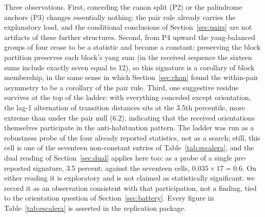 \documentclass[11pt]{article}
\begin{document}
Three observations. First, conceding the canon split (P2) or the palindrome anchors (P3) changes essentially nothing: the pair rule already carries the explanatory load, and the conditional conclusions of Section~\ref{sec:pairs} are not artifacts of these further structures. Second, from P4 upward the yang-balanced groups of four cease to be a statistic and become a constant: preserving the block partition preserves each block's yang sum (in the received sequence the sixteen sums include exactly seven equal to 12), so this signature is a corollary of block membership, in the same sense in which Section~\ref{sec:chan} found the within-pair asymmetry to be a corollary of the pair rule. Third, one suggestive residue survives at the top of the ladder: with everything conceded except orientation, the lag-1 alternation of transition distances sits at the 3.5th percentile, more extreme than under the pair null (6.2), indicating that the received orientations themselves participate in the anti-habituation pattern. The ladder was run as a robustness probe of the four already reported statistics, not as a search; still, this cell is one of the seventeen non-constant entries of Table~\ref{tab:escalera}, and the dual reading of Section~\ref{sec:dual} applies here too: as a probe of a single pre-reported signature, 3.5 percent; against the seventeen cells, $0.035 \times 17 = 0.6$. On either reading it is exploratory and is not claimed as statistically significant: we record it as an observation consistent with that participation, not a finding, tied to the orientation question of Section~\ref{sec:battery}. Every figure in Table~\ref{tab:escalera} is asserted in the replication package.
\end{document}
